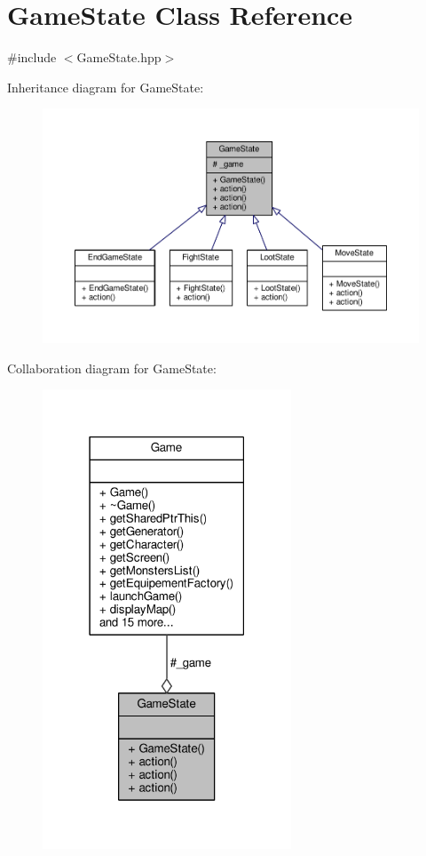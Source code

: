 \hypertarget{class_game_state}{\section{Game\-State Class Reference}
\label{class_game_state}
}


{\ttfamily \#include $<$Game\-State.\-hpp$>$}



Inheritance diagram for Game\-State\-:
\nopagebreak
\begin{figure}[H]
\begin{center}
\leavevmode
\includegraphics[width=350pt]{class_game_state__inherit__graph}
\end{center}
\end{figure}


Collaboration diagram for Game\-State\-:
\nopagebreak
\begin{figure}[H]
\begin{center}
\leavevmode
\includegraphics[width=210pt]{class_game_state__coll__graph}
\end{center}
\end{figure}
